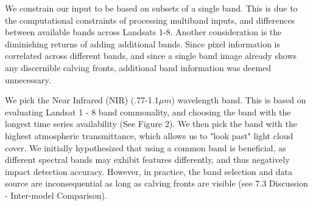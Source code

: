 \documentclass[tc, manuscript]{copernicus}
\begin{document}
We constrain our input to be based on subsets of a single band. This is due to the computational constraints of processing multiband inputs, and differences between available bands across Landsats 1-8. Another consideration is the diminishing returns of adding additional bands. Since pixel information is correlated across different bands, and since a single band image already shows any discernible calving fronts, additional band information was deemed unnecessary.

We pick the Near Infrared (NIR) (.77-1.1$\mu m$) wavelength band. This is based on evaluating  Landsat 1 - 8 band commonality, and choosing the band with the longest time series availability (See Figure 2). We then pick the band with the highest atmospheric transmittance, which allows us to "look past" light cloud cover. We initially hypothesized that using a common band is beneficial, as different spectral bands may exhibit features differently, and thus negatively impact detection accuracy. However, in practice, the band selection and data source are inconsequential as long as calving fronts are visible (see 7.3 Discussion - Inter-model Comparison).

\end{document}
